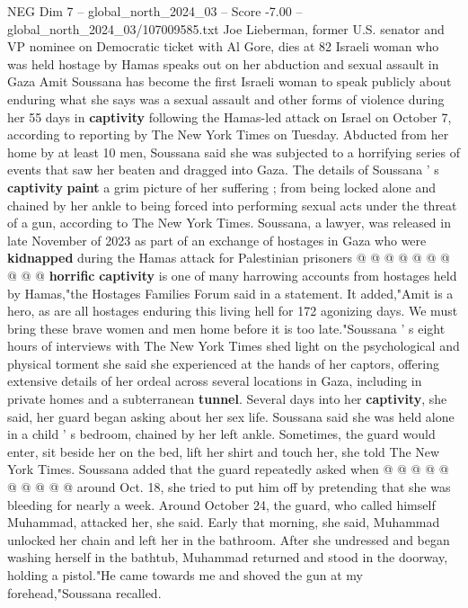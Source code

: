 \begin{textsample}{NEG Dim 7 – global\_north\_2024\_03 – Score -7.00 – global\_north\_2024\_03/107009585.txt}  \label{ex:f7_neg_234}
Joe Lieberman, former U.S. senator and VP nominee on Democratic ticket with Al Gore, dies at 82 Israeli woman who was held hostage by Hamas speaks out on her abduction and sexual assault in Gaza Amit Soussana has become the first Israeli woman to speak publicly about enduring what she says was a sexual assault and other forms of violence during her 55 days in \textbf{captivity} following the Hamas-led attack on Israel on October 7, according to reporting by The New York Times on Tuesday.
Abducted from her home by at least 10 men, Soussana said she was subjected to a horrifying series of events that saw her beaten and dragged into Gaza.
The details of Soussana ' s \textbf{captivity} \textbf{paint} a grim picture of her suffering ; from being locked alone and chained by her ankle to being forced into performing sexual acts under the threat of a gun, according to The New York Times.
Soussana, a lawyer, was released in late November of 2023 as part of an exchange of hostages in Gaza who were \textbf{kidnapped} during the Hamas attack for Palestinian prisoners @ @ @ @ @ @ @ @ @ @ \textbf{horrific} \textbf{captivity} is one of many harrowing accounts from hostages held by Hamas,"the Hostages Families Forum said in a statement.
It added,"Amit is a hero, as are all hostages enduring this living hell for 172 agonizing days.
We must bring these brave women and men home before it is too late."Soussana ' s eight hours of interviews with The New York Times shed light on the psychological and physical torment she said she experienced at the hands of her captors, offering extensive details of her ordeal across several locations in Gaza, including in private homes and a subterranean \textbf{tunnel}.
Several days into her \textbf{captivity}, she said, her guard began asking about her sex life.
Soussana said she was held alone in a child ' s bedroom, chained by her left ankle.
Sometimes, the guard would enter, sit beside her on the bed, lift her shirt and touch her, she told The New York Times.
Soussana added that the guard repeatedly asked when @ @ @ @ @ @ @ @ @ @ around Oct. 18, she tried to put him off by pretending that she was bleeding for nearly a week.
Around October 24, the guard, who called himself Muhammad, attacked her, she said.
Early that morning, she said, Muhammad unlocked her chain and left her in the bathroom.
After she undressed and began washing herself in the bathtub, Muhammad returned and stood in the doorway, holding a pistol."He came towards me and shoved the gun at my forehead,"Soussana recalled.

\end{textsample}
